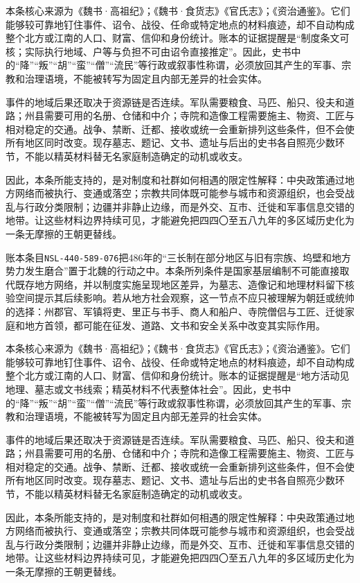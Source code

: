 本条核心来源为《魏书·高祖纪》；《魏书·食货志》《官氏志》；《资治通鉴》。它们能够较可靠地钉住事件、诏令、战役、任命或特定地点的材料痕迹，却不自动构成整个北方或江南的人口、财富、信仰和身份统计。账本的证据提醒是“制度条文可核；实际执行地域、户等与负担不可由诏令直接推定”。因此，史书中的“降”“叛”“胡”“蛮”“僧”“流民”等行政或叙事性称谓，必须放回其产生的军事、宗教和治理语境，不能被转写为固定且内部无差异的社会实体。

事件的地域后果还取决于资源链是否连续。军队需要粮食、马匹、船只、役夫和道路；州县需要可用的名册、仓储和中介；寺院和造像工程需要施主、物资、工匠与相对稳定的交通。战争、禁断、迁都、接收或统一会重新排列这些条件，但不会使所有地区同时改变。现存墓志、题记、文书、遗址与后出的史书各自照亮少数环节，不能以精英材料替无名家庭制造确定的动机或收支。

因此，本条所能支持的，是对制度和社群如何相遇的限定性解释：中央政策通过地方网络而被执行、变通或落空；宗教共同体既可能参与城市和资源组织，也会受战乱与行政分类限制；边疆并非静止边缘，而是外交、互市、迁徙和军事信息交错的地带。让这些材料边界持续可见，才能避免把四四〇至五八九年的多区域历史化为一条无摩擦的王朝更替线。

账本条目\texttt{NSL-440-589-076}把486年的“三长制在部分地区与旧有宗族、坞壁和地方势力发生磨合”置于北魏的行动之中。本条所列条件是国家基层编制不可能直接取代既存地方网络，并以制度实施呈现地区差异，为墓志、造像记和地理材料留下核验空间提示其后续影响。若从地方社会观察，这一节点不应只被理解为朝廷或统帅的选择：州郡官、军镇将吏、里正与书手、商人和船户、寺院僧侣与工匠、迁徙家庭和地方首领，都可能在征发、道路、文书和安全关系中改变其实际作用。

本条核心来源为《魏书·高祖纪》；《魏书·食货志》《官氏志》；《资治通鉴》。它们能够较可靠地钉住事件、诏令、战役、任命或特定地点的材料痕迹，却不自动构成整个北方或江南的人口、财富、信仰和身份统计。账本的证据提醒是“地方活动见地理、墓志或文书线索；精英材料不代表整体社会”。因此，史书中的“降”“叛”“胡”“蛮”“僧”“流民”等行政或叙事性称谓，必须放回其产生的军事、宗教和治理语境，不能被转写为固定且内部无差异的社会实体。

事件的地域后果还取决于资源链是否连续。军队需要粮食、马匹、船只、役夫和道路；州县需要可用的名册、仓储和中介；寺院和造像工程需要施主、物资、工匠与相对稳定的交通。战争、禁断、迁都、接收或统一会重新排列这些条件，但不会使所有地区同时改变。现存墓志、题记、文书、遗址与后出的史书各自照亮少数环节，不能以精英材料替无名家庭制造确定的动机或收支。

因此，本条所能支持的，是对制度和社群如何相遇的限定性解释：中央政策通过地方网络而被执行、变通或落空；宗教共同体既可能参与城市和资源组织，也会受战乱与行政分类限制；边疆并非静止边缘，而是外交、互市、迁徙和军事信息交错的地带。让这些材料边界持续可见，才能避免把四四〇至五八九年的多区域历史化为一条无摩擦的王朝更替线。

